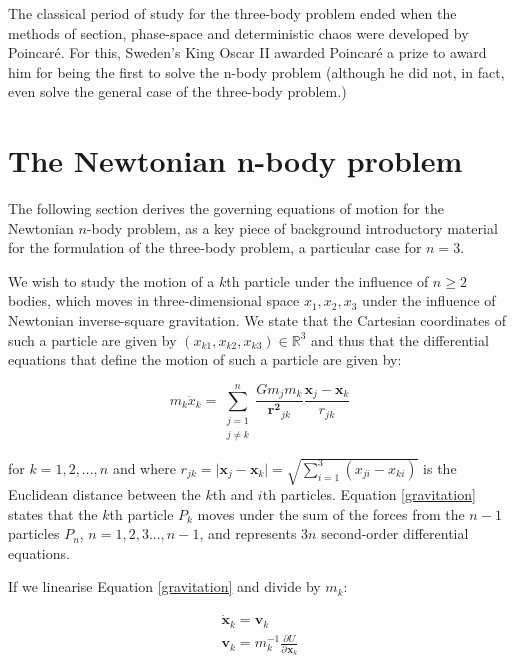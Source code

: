 The classical period of study for the three-body problem ended when the methods of section, phase-space and deterministic chaos were developed by Poincar\'e. For this, Sweden’s King Oscar II awarded Poincar\'e a prize to award him for being the first to solve the n-body problem (although he did not, in fact, even solve the general case of the three-body problem.)

\section{The Newtonian n-body problem}

The following section derives the governing equations of motion for the Newtonian $n$-body problem, as a key piece of background introductory material for the formulation of the three-body problem, a particular case for $n=3$.

We wish to study the motion of a $k$th particle under the influence of $n \geqslant 2$ bodies, which moves in three-dimensional space $x_1, x_2, x_3$ under the influence of Newtonian inverse-square gravitation. We state that the Cartesian coordinates of such a particle are given by $(x_{k1}, x_{k2}, x_{k3}) \in \mathbb{R}^3$ and thus that the differential equations that define the motion of such a particle are given by:

\begin{equation}\label{gravitation}
m_k \ddot{x}_k = \sum_{\substack{j=1 \\ j \neq k}}^{n} \frac{Gm_j m_k}{\pmb{r^2}_{jk}} \frac{\pmb{x}_j - \pmb{x}_k}{r_{jk}}
\end{equation}

for $k = 1, 2, ..., n$ and where $r_{jk} = \lvert \pmb{x}_j - \pmb{x}_k \rvert = \sqrt{\sum_{i=1}^3 (x_{ji} - x_{ki})}$ is the Euclidean distance between the $k$th and $i$th particles. Equation \ref{gravitation} states that the $k$th particle $P_k$ moves under the sum of the forces from the $n-1$ particles $P_n$, $n = 1, 2, 3..., n-1$, and represents $3n$ second-order differential equations.

If we linearise Equation \ref{gravitation} and divide by $m_k$:

\begin{equation}\label{eq:newtonianvelocity}
\begin{aligned}
\dot{\pmb{x}}_k = \pmb{v}_k\\
\pmb{v}_k = m^{-1}_k \frac{\partial U}{\partial \hspace{1pt} \pmb{x}_k}
\end{aligned}
\end{equation}

